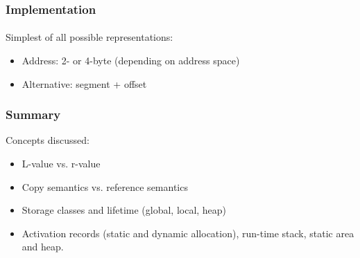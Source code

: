 \documentclass{beamer}
\begin{document}
{\begin{frame}[fragile]
\end{frame}



\begin{frame}[fragile]
\frametitle{Implementation}
\framesubtitle{}
Simplest of all possible representations:
\begin{itemize}
\item Address: 2- or 4-byte (depending on address space)
\item Alternative: segment + offset
\end{itemize}
\end{frame}


} %

\begin{frame}[fragile]
\frametitle{Summary}
Concepts discussed:
\bigskip

\begin{itemize}
\item L-value vs. r-value
\item Copy semantics vs. reference semantics
\item Storage classes and lifetime (global, local, heap)
\item Activation records (static and dynamic allocation), run-time stack,
static area and heap. 
\end{itemize}
\end{frame}
\end{document}
